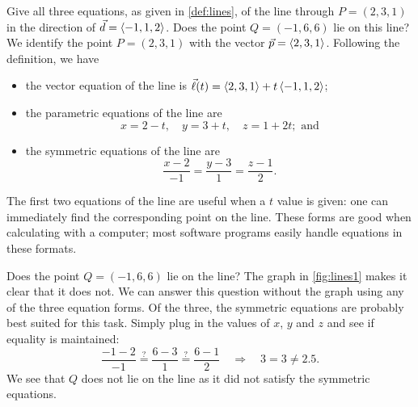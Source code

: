 \begin{example}\label{ex_lines1}%
Give all three equations, as given in \autoref{def:lines}, of the line through $P = (2,3,1)$ in the direction of $\vec d =\left\langle -1,1,2\right\rangle$. Does the point $Q=(-1,6,6)$ lie on this line?
\solution
We identify the point $P=(2,3,1)$ with the vector $\vec p =\left\langle 2,3,1\right\rangle$. Following the definition, we have
\begin{itemize}
	\item the vector equation of the line is $\vec\ell(t) =\left\langle 2,3,1\right\rangle+ t\left\langle -1,1,2\right\rangle$;
	\item	the parametric equations of the line are
	\[x = 2-t,\quad y = 3+t,\quad z = 1+2t; \text{ and}\]
	\item	the symmetric equations of the line are
	\[\frac{x-2}{-1}=\frac{y-3}{1} = \frac{z-1}{2}.\]
\end{itemize}

The first two equations of the line are useful when a $t$ value is given: one can immediately find the corresponding point on the line. These forms are good when calculating with a computer; most software programs easily handle equations in these formats.


Does the point $Q = (-1,6,6)$ lie on the line? The graph in \autoref{fig:lines1} makes it clear that it does not. We can answer this question without the graph using any of the three equation forms. Of the three, the symmetric equations are probably best suited for this task. Simply plug in the values of $x$, $y$ and $z$ and see if equality is maintained:
\[
\frac{-1-2}{-1} \stackrel{?}{=} \frac{6-3}{1} \stackrel{?}{=} \frac{6-1}{2}
\quad \Rightarrow \quad 3=3\neq2.5.
\]
We see that $Q$ does not lie on the line as it did not satisfy the symmetric equations.
\end{example}

